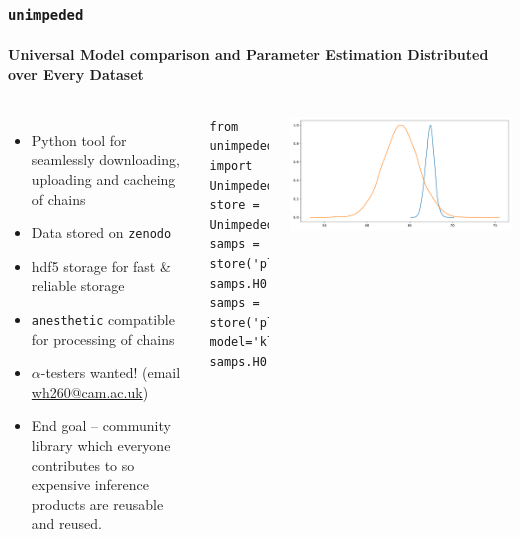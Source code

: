 \documentclass[aspectratio=169]{beamer}
\begin{document}
\begin{frame}[fragile]
    \frametitle{\texttt{unimpeded}}
    \framesubtitle{Universal Model comparison and Parameter Estimation Distributed over Every Dataset}
    \begin{columns}
    \begin{itemize}
        \item Python tool for seamlessly downloading, uploading and cacheing of chains
        \item Data stored on \texttt{zenodo} 
        \item hdf5 storage for fast \& reliable storage
        \item \texttt{anesthetic} compatible for processing of chains~
        \item $\alpha$-testers wanted! (email \href{mailto:wh260@cam.ac.uk}{wh260@cam.ac.uk}) 
        \item End goal -- community library which everyone contributes to so expensive inference products are reusable and reused.
    \end{itemize}


\lstset{language=Python}
\lstset{frame=lines}
\lstset{basicstyle=\footnotesize}
\begin{lstlisting}
from unimpeded import Unimpeded
store = Unimpeded(cache='data.hdf5')
samps = store('planck')
samps.H0.plot.kde_1d()
samps = store('planck', model='klcdm')
samps.H0.plot.kde_1d()
\end{lstlisting}
\includegraphics[width=\textwidth]{figures/unimpeded.pdf}

        
    \end{columns}
\end{frame}
\end{document}

